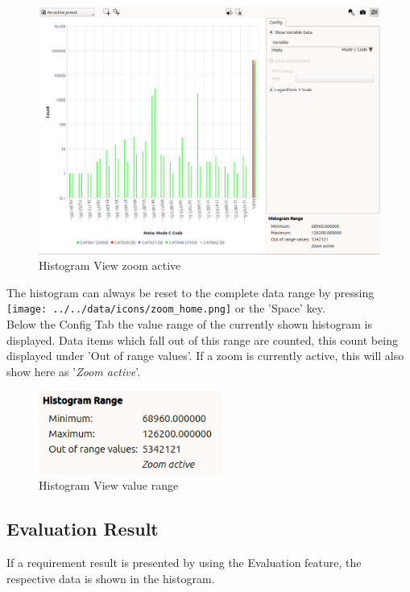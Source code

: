 \begin{figure}[H]
    \hspace*{-2cm}
    \includegraphics[width=18cm,frame]{figures/histogram_zoomed.png}
  \caption{Histogram View zoom active}
\end{figure}

The histogram can always be reset to the complete data range by pressing \texttt{[image: ../../data/icons/zoom\_home.png]} or the 'Space' key. \\

Below the Config Tab the value range of the currently shown histogram is displayed. 
Data items which fall out of this range are counted, this count being displayed under 'Out of range values'.
If a zoom is currently active, this will also show here as '\textit{Zoom active}'.

\begin{figure}[H]
    \center
    \includegraphics[width=6cm,frame]{figures/histogram_zoom_active.png}
  \caption{Histogram View value range}
\end{figure}

\subsection{Evaluation Result}

If a requirement result is presented by using the Evaluation feature, the respective data is shown in the histogram.

